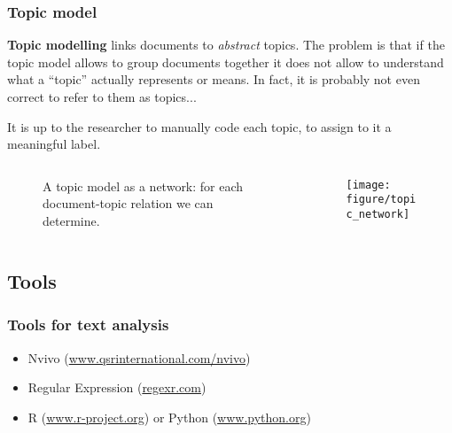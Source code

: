 \documentclass[serif, aspectratio=169]{beamer}
\begin{document}
\begin{frame}
\frametitle{Topic model}

\textbf{Topic modelling} links documents to \textit{abstract} topics. The problem is that if the topic model allows to group documents together it does not allow to understand what a ``topic'' actually represents or means. In fact, it is probably not even correct to refer to them as topics...

It is up to the researcher to manually code each topic, to assign to it a meaningful label.

\begin{columns}
\begin{column}{0.5\textwidth}
\begin{figure}
\caption{A topic model as a network: for each document-topic relation we can determine.}
\end{figure}
\end{column}
\begin{column}{0.3\textwidth}
\begin{figure}
    \texttt{[image: figure/topic\_network]}
\end{figure}
\end{column}
\end{columns}
\end{frame}

\begin{frame}

\end{frame}


\subsection{Tools}

\begin{frame}
\frametitle{Tools for text analysis}

\begin{itemize}

\item Nvivo (\url{www.qsrinternational.com/nvivo})

\item Regular Expression (\url{regexr.com})

\item R (\url{www.r-project.org}) or Python (\url{www.python.org})

\end{itemize}

\end{frame}
\end{document}
